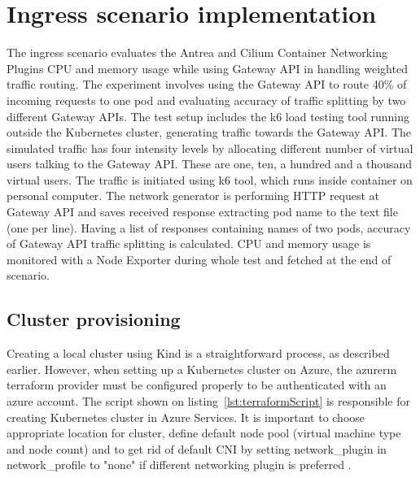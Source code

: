 \section{Ingress scenario implementation}
\label{sec:ingressImpl}

The ingress scenario evaluates the Antrea and Cilium Container Networking Plugins CPU and memory usage while using Gateway API in handling weighted traffic routing. The experiment involves using the Gateway API to route 40\% of incoming requests to one pod and evaluating accuracy of traffic splitting by two different Gateway APIs. The test setup includes the k6 load testing tool running outside the Kubernetes cluster, generating traffic towards the Gateway API. The simulated traffic has four intensity levels by allocating different number of virtual users talking to the Gateway API. These are one, ten, a hundred and a thousand virtual users. The traffic is initiated using k6 tool, which runs inside container on personal computer. The network generator is performing HTTP request at Gateway API and saves received response extracting pod name to the text file (one per line). Having a list of responses containing names of two pods, accuracy of Gateway API traffic splitting is calculated. CPU and memory usage is monitored with a Node Exporter during whole test and fetched at the end of scenario.


\subsection{Cluster provisioning}
\label{sec:clusterProvisioning}

Creating a local cluster using Kind is a straightforward process, as described earlier. However, when setting up a Kubernetes cluster on Azure, the azurerm terraform provider must be configured properly to be authenticated with an azure account. The script shown on listing~\ref{lst:terraformScript} is responsible for creating Kubernetes cluster in Azure Services. It is important to choose appropriate location for cluster, define default node pool (virtual machine type and node count) and to get rid of default CNI by setting network\_plugin in network\_profile to "none" if different networking plugin is preferred \cite{AKS}.


